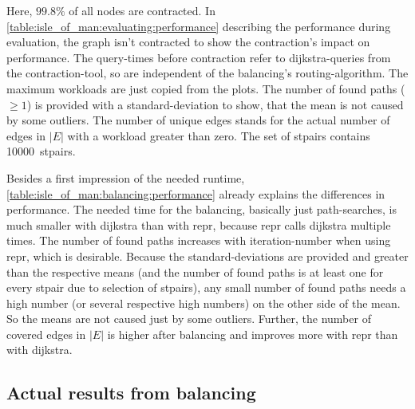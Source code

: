 \begin{table}[htbp]
{                Here, $\si{\num{99.8} \percent}$ of all nodes are contracted.
                In \cref{table:isle_of_man:evaluating:performance} describing the performance during evaluation, the graph isn't contracted to show the contraction's impact on performance.
                The query-times before contraction refer to \gls{dijkstra}-queries from the contraction-tool, so are independent of the \gls{balancing}'s routing-algorithm.
                The maximum workloads are just copied from the plots.
                The number of found paths ($\ge 1$) is provided with a standard-deviation to show, that the mean is not caused by some outliers.
                The number of unique edges stands for the actual number of edges in $|E|$ with a workload greater than zero.
                The set of \glspl{stpair} contains \num{10000}~\glspl{stpair}.
                \label{table:isle_of_man:balancing:performance}
            }
        \end{table}

        Besides a first impression of the needed runtime, \vref{table:isle_of_man:balancing:performance} already explains the differences in performance.
        The needed time for the \gls{balancing}, basically just path-searches, is much smaller with \gls{dijkstra} than with \gls{repr}, because \gls{repr} calls \gls{dijkstra} multiple times.
        The number of found paths increases with iteration-number when using \gls{repr}, which is desirable.
        Because the standard-deviations are provided and greater than the respective means (and the number of found paths is at least one for every \gls{stpair} due to selection of \glspl{stpair}), any small number of found paths needs a high number (or several respective high numbers) on the other side of the mean.
        So the means are not caused just by some outliers.
        Further, the number of covered edges in $|E|$ is higher after \gls{balancing} and improves more with \gls{repr} than with \gls{dijkstra}.

    \subsection{Actual results from balancing}

